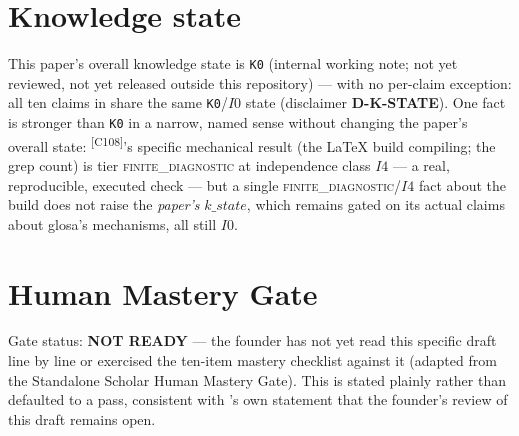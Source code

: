 \documentclass[11pt]{article}
\newcommand{\FiniteDiag}{\textsc{finite\_diagnostic}}
\newcommand{\claimref}[1]{\textsuperscript{[#1]}}
\begin{document}
\section{Knowledge state}
\label{sec:kstate}
This paper's overall knowledge state is \texttt{K0} (internal working note; not yet reviewed, not
yet released outside this repository) --- with no per-claim exception: all ten claims in
 share the same \texttt{K0}/\(I0\) state (disclaimer \textbf{D-K-STATE}).
One fact is stronger than \texttt{K0} in a narrow, named sense without changing the paper's overall
state: \claimref{C108}'s specific mechanical result (the LaTeX build compiling; the grep count) is
tier \FiniteDiag{} at independence class $I4$ --- a real, reproducible, executed check --- but a
single \FiniteDiag{}/$I4$ fact about the build does not raise the \emph{paper's} $k\_state$, which
remains gated on its actual claims about glosa's mechanisms, all still $I0$.

\section{Human Mastery Gate}
\label{sec:mastery-gate}
Gate status: \textbf{NOT READY} --- the founder has not yet read this specific draft line by line
or exercised the ten-item mastery checklist against it (adapted from the Standalone Scholar Human
Mastery Gate). This is stated plainly rather than defaulted to a pass, consistent with
's own statement that the founder's review of this draft remains open.
\end{document}
